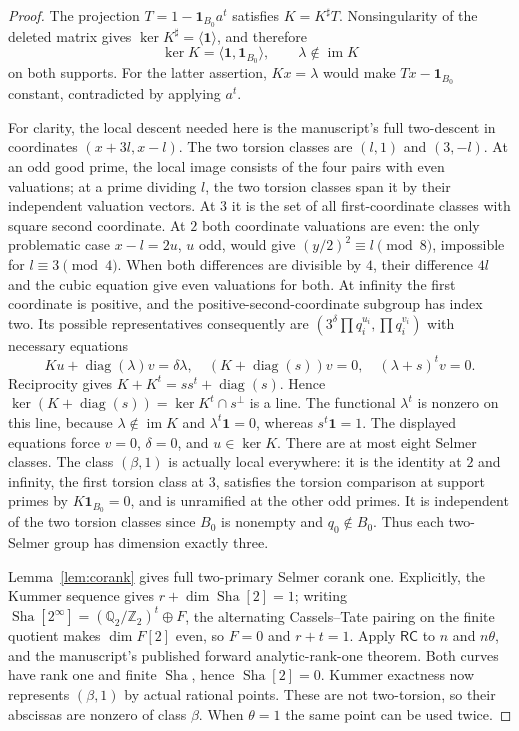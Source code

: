 \documentclass[11pt]{article}
\theoremstyle{definition}
\theoremstyle{remark}
\newcommand{\Sha}{\operatorname{Sha}}
\begin{document}
\begin{proof}
The projection $T=1-\mathbf1_{B_0}a^t$ satisfies $K=K^\sharp T$.
Nonsingularity of the deleted matrix gives
$\ker K^\sharp=\langle\mathbf1\rangle$, and therefore
\[
 \ker K=\langle\mathbf1,\mathbf1_{B_0}\rangle,
 \qquad \lambda\notin\operatorname{im}K
\]
on both supports. For the latter assertion, $Kx=\lambda$ would
make $Tx-\mathbf1_{B_0}$ constant, contradicted by applying $a^t$.

For clarity, the local descent needed here is the manuscript's full
two-descent in coordinates $(x+3l,x-l)$. The two torsion classes are
$(l,1)$ and $(3,-l)$. At an odd good prime, the local image consists
of the four pairs with even valuations; at a prime dividing $l$,
the two torsion classes span it by their independent valuation
vectors. At $3$ it is the set of all first-coordinate classes with
square second coordinate. At $2$ both coordinate valuations are
even: the only problematic case $x-l=2u$, $u$ odd, would give
$(y/2)^2\equiv l\pmod8$, impossible for $l\equiv3\pmod4$.
When both differences are divisible by $4$, their difference $4l$
and the cubic equation give even valuations for both. At infinity
the first coordinate is positive, and the positive-second-coordinate
subgroup has index two. Its possible representatives consequently are
$(3^\delta\prod q_i^{u_i},\prod q_i^{v_i})$ with necessary equations
\[
 Ku+\operatorname{diag}(\lambda)v=\delta\lambda,
 \quad (K+\operatorname{diag}(s))v=0,
 \quad (\lambda+s)^tv=0.
\]
Reciprocity gives $K+K^t=ss^t+\operatorname{diag}(s)$.
Hence $\ker(K+\operatorname{diag}(s))=\ker K^t\cap s^\perp$
is a line. The functional $\lambda^t$ is nonzero on this line,
because $\lambda\notin\operatorname{im}K$ and
$\lambda^t\mathbf1=0$, whereas $s^t\mathbf1=1$.
The displayed equations force $v=0$, $\delta=0$, and $u\in\ker K$.
There are at most eight Selmer classes.
The class $(\beta,1)$ is actually local everywhere: it is the identity
at $2$ and infinity, the first torsion class at $3$, satisfies the
torsion comparison at support primes by $K\mathbf1_{B_0}=0$, and
is unramified at the other odd primes. It is independent of the two
torsion classes since $B_0$ is nonempty and $q_0\notin B_0$.
Thus each two-Selmer group has dimension exactly three.

Lemma~\ref{lem:corank} gives full two-primary Selmer
corank one. Explicitly, the Kummer sequence gives
$r+\dim\Sha[2]=1$; writing
$\Sha[2^\infty]=(\mathbb Q_2/\mathbb Z_2)^t\oplus F$, the
alternating Cassels--Tate pairing on the finite quotient makes
$\dim F[2]$ even, so $F=0$ and $r+t=1$.
Apply $\mathsf{RC}$ to $n$ and $n\theta$, and the manuscript's
published forward analytic-rank-one theorem. Both curves have rank
one and finite $\Sha$, hence $\Sha[2]=0$. Kummer exactness now
represents $(\beta,1)$ by actual rational points. These are not
two-torsion, so their abscissas are nonzero of class $\beta$.
When $\theta=1$ the same point can be used twice.
\end{proof}
\end{document}
